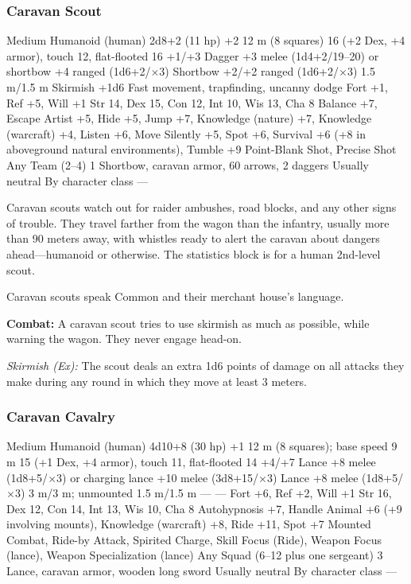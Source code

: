\subsubsection{Caravan Scout}
\begin{MonsterStats}
{Medium Humanoid (human)}
{2d8+2 (11 hp)}
{+2}
{12 m (8 squares)}
{16 (+2 Dex, +4 armor), touch 12, flat-flooted 16}
{+1/+3}
{Dagger +3 melee (1d4+2/19--20) or shortbow +4 ranged (1d6+2/$\times$3)}
{Shortbow +2/+2 ranged (1d6+2/$\times$3)}
{1.5 m/1.5 m}
{Skirmish +1d6}
{Fast movement, trapfinding, uncanny dodge}
{Fort +1, Ref +5, Will +1}
{Str 14, Dex 15, Con 12, Int 10, Wis 13, Cha 8}
{
	Balance +7,
	Escape Artist +5,
	Hide +5,
	Jump +7,
	Knowledge (nature) +7,
	Knowledge (warcraft) +4,
	Listen +6,
	Move Silently +5,
	Spot +6,
	Survival +6 (+8 in aboveground natural environments),
	Tumble +9
}
{
	Point-Blank Shot,
	Precise Shot
}
{Any}
{Team (2--4)}
{1}
{Shortbow, caravan armor, 60 arrows, 2 daggers}
{Usually neutral}
{By character class}
{---}
\end{MonsterStats}

Caravan scouts watch out for raider ambushes, road blocks, and any other signs of trouble. They travel farther from the wagon than the infantry, usually more than 90 meters away, with whistles ready to alert the caravan about dangers ahead---humanoid or otherwise. The statistics block is for a human 2nd-level scout.

Caravan scouts speak Common and their merchant house's language.

\textbf{Combat:} A caravan scout tries to use skirmish as much as possible, while warning the wagon. They never engage head-on.

\textit{Skirmish (Ex):} The scout deals an extra 1d6 points of damage on all attacks they make during any round in which they move at least 3 meters.


\subsubsection{Caravan Cavalry}
\begin{MonsterStats}
{Medium Humanoid (human)}
{4d10+8 (30 hp)}
{+1}
{12 m (8 squares); base speed 9 m}
{15 (+1 Dex, +4 armor), touch 11, flat-flooted 14}
{+4/+7}
{Lance +8 melee (1d8+5/$\times$3) or charging lance +10 melee (3d8+15/$\times$3)}
{Lance +8 melee (1d8+5/$\times$3)}
{3 m/3 m; unmounted 1.5 m/1.5 m}
{---}
{---}
{Fort +6, Ref +2, Will +1}
{Str 16, Dex 12, Con 14, Int 13, Wis 10, Cha 8}
{
	Autohypnosis +7,
	Handle Animal +6 (+9 involving mounts),
	Knowledge (warcraft) +8,
	Ride +11,
	Spot +7
}
{
	Mounted Combat,
	Ride-by Attack,
	Spirited Charge,
	Skill Focus (Ride),
	Weapon Focus (lance),
	Weapon Specialization (lance)
}
{Any}
{Squad (6--12 plus one sergeant)}
{3}
{
	Lance,
	caravan armor,
	wooden long sword
}
{Usually neutral}
{By character class}
{---}
\end{MonsterStats}

